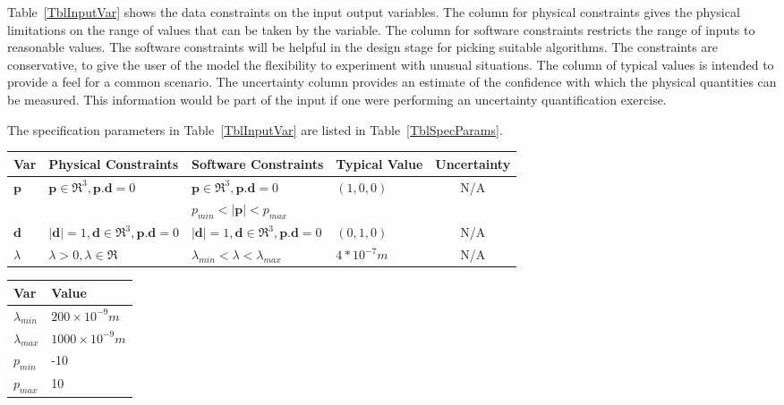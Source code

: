 \documentclass[12pt]{article}
\begin{document}
	Table~\ref{TblInputVar} shows the data constraints on the input output
	variables.  The column for physical constraints gives the physical limitations
	on the range of values that can be taken by the variable.  The column for
	software constraints restricts the range of inputs to reasonable values.  The
	software constraints will be helpful in the design stage for picking suitable
	algorithms.  The constraints are conservative, to give the user of the model
	the flexibility to experiment with unusual situations.  The column of typical
	values is intended to provide a feel for a common scenario.  The uncertainty
	column provides an estimate of the confidence with which the physical
	quantities can be measured.  This information would be part of the input if one
	were performing an uncertainty quantification exercise.
	
	The specification parameters in Table~\ref{TblInputVar} are listed in
	Table~\ref{TblSpecParams}.
	
	\begin{table}[!h] \caption{Input Variables} \label{TblInputVar}
		\renewcommand{\arraystretch}{1.2} \noindent \begin{longtable*}{l l l l c}
			\toprule \textbf{Var} & \textbf{Physical Constraints} & \textbf{Software
				Constraints} & \textbf{Typical Value} & Uncertainty\\ \midrule $\textbf{p}$ &
			$\textbf{p} \in \Re^{3} , \textbf{p}.\textbf{d}=0$ & $ \textbf{p} \in \Re^{3},
			\textbf{p}.\textbf{d}=0$ & $(1,0,0)$ & N/A \\ &   & $p_{min} < |\textbf{p}| <
			p_{max}$ & & \\ $\textbf{d}$ & $|\textbf{d}|=1,  \textbf{d} \in \Re^{3},
			\textbf{p}.\textbf{d}=0$ & $|\textbf{d}|=1, \textbf{d} \in \Re^{3},
			\textbf{p}.\textbf{d}=0$ & $(0,1,0)$& N/A\\ $\lambda$ & $\lambda>0,  \lambda
			\in \Re$ & $\lambda_{min} <\lambda< \lambda_{max}$ & $4 * 10^{-7} m$& N/A\\
			\bottomrule \end{longtable*} \end{table}
	
	\begin{table}[!h] \caption{Specification Parameter Values}
		\label{TblSpecParams} \renewcommand{\arraystretch}{1.2} \noindent
		\begin{longtable*}{l l} \toprule \textbf{Var} & \textbf{Value} \\ \midrule 
			$\lambda_{min}$ & $200 \times 10^{-9} m$\\ $\lambda_{max}$ & $1000 \times
			10^{-9} m$\\ $p_{min}$ & -10 \\ $p_{max}$ & 10 \\
			
			
			\bottomrule \end{longtable*} \end{table}
	
\end{document}
